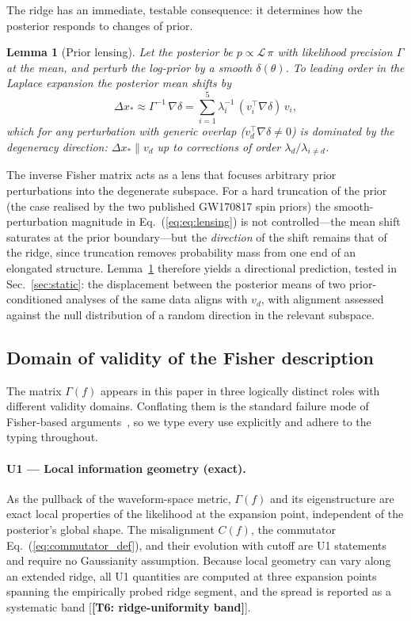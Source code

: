 \documentclass[twocolumn,prd,showpacs,superscriptaddress]{revtex4-2}
\newtheorem{lemma}{Lemma}
\newcommand{\vd}{v_{d}}          %
\newcommand{\manifest}[1]{\textbf{[#1]}}
\newcommand{\secref}[1]{Sec.~\ref{sec:#1}}
\newcommand{\eqnref}[1]{Eq.~(\ref{eq:#1})}
\begin{document}
The ridge has an immediate, testable consequence: it determines how the posterior responds to changes of prior.

\begin{lemma}[Prior lensing]
\label{lem:lensing}
Let the posterior be $p \propto \mathcal{L}\,\pi$ with likelihood precision $\Gamma$ at the mean, and perturb the log-prior by a smooth $\delta(\theta)$. To leading order in the Laplace expansion the posterior mean shifts by
\begin{equation}
\Delta x_{*} \approx \Gamma^{-1}\,\nabla\delta
= \sum_{i=1}^{5} \lambda_i^{-1}\,(v_i^{\top}\nabla\delta)\,v_i ,
\label{eq:lensing}
\end{equation}
which for any perturbation with generic overlap ($v_d^{\top}\nabla\delta \neq 0$) is dominated by the degeneracy direction: $\Delta x_{*} \parallel \vd$ up to corrections of order $\lambda_d/\lambda_{i\neq d}$.
\end{lemma}

The inverse Fisher matrix acts as a lens that focuses arbitrary prior perturbations into the degenerate subspace. For a hard truncation of the prior (the case realised by the two published GW170817 spin priors) the smooth-perturbation magnitude in \eqnref{eq:lensing} is not controlled---the mean shift saturates at the prior boundary---but the \emph{direction} of the shift remains that of the ridge, since truncation removes probability mass from one end of an elongated structure. Lemma~\ref{lem:lensing} therefore yields a directional prediction, tested in \secref{static}: the displacement between the posterior means of two prior-conditioned analyses of the same data aligns with $\vd$, with alignment assessed against the null distribution of a random direction in the relevant subspace.

\subsection{Domain of validity of the Fisher description}
\label{sec:validity}

The matrix $\Gamma(f)$ appears in this paper in three logically distinct roles with different validity domains. Conflating them is the standard failure mode of Fisher-based arguments~\cite{vallisneri2008fisher}, so we type every use explicitly and adhere to the typing throughout.

\paragraph{U1 --- Local information geometry (exact).}
As the pullback of the waveform-space metric, $\Gamma(f)$ and its eigenstructure are exact local properties of the likelihood at the expansion point, independent of the posterior's global shape. The misalignment $C(f)$, the commutator \eqnref{commutator_def}, and their evolution with cutoff are U1 statements and require no Gaussianity assumption. Because local geometry can vary along an extended ridge, all U1 quantities are computed at three expansion points spanning the empirically probed ridge segment, and the spread is reported as a systematic band [\manifest{T6: ridge-uniformity band}].
\end{document}

